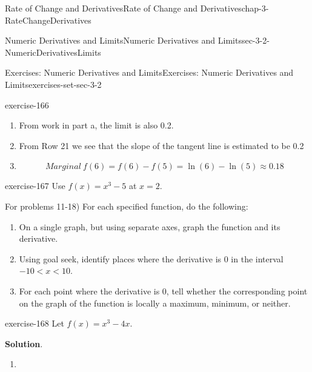 \documentclass[oneside,10pt,]{book}
\numberwithin{equation}{section}
\newcommand{\lt}{<}
\begin{document}
\begin{chapterptx}{Rate of Change and Derivatives}{}{Rate of Change and Derivatives}{}{}{chap-3-RateChangeDerivatives}
\begin{sectionptx}{Numeric Derivatives and Limits}{}{Numeric Derivatives and Limits}{}{}{sec-3-2-NumericDerivativesLimits}
\begin{exercises-subsection-numberless}{Exercises: Numeric Derivatives and Limits}{}{Exercises: Numeric Derivatives and Limits}{}{}{exercises-set-sec-3-2}
\begin{exercisegroup}
\begin{divisionexerciseeg}{9}{}{}{exercise-166}
\begin{enumerate}[label=(\alph*)]
\begin{sidebyside}{1}{0.05}{0.05}{0}
\end{sidebyside}%
\par
\hypertarget{p-1092}{}%
The slope of the secant line is 0.2.%
\item\hypertarget{li-338}{}\hypertarget{p-1093}{}%
From work in part a, the limit is also 0.2.%
\item\hypertarget{li-339}{}\hypertarget{p-1094}{}%
From Row 21 we see that the slope of the tangent line is estimated to be 0.2%
\item\hypertarget{li-340}{}\hypertarget{p-1095}{}%
%
\begin{equation*}
Marginal\ f(6)=f(6)-f(5)=\ln(6)-\ln(5)\approx 0.18
\end{equation*}
%
\end{enumerate}
\end{divisionexerciseeg}%
\begin{divisionexerciseeg}{10}{}{}{exercise-167}%
\hypertarget{p-1096}{}%
Use \(f(x)=x^3-5\) at \(x=2\).%
\end{divisionexerciseeg}%
\end{exercisegroup}
\par\medskip\noindent
\par\medskip\noindent%
\hypertarget{exercisegroup-16}{}%
\hypertarget{p-1097}{}%
For problems 11-18) For each specified function, do the following:%
\leavevmode%
\begin{enumerate}[label=(\alph*)]
\item\hypertarget{li-341}{}\hypertarget{p-1098}{}%
On a single graph, but using separate axes, graph the function and its derivative.%
\item\hypertarget{li-342}{}\hypertarget{p-1099}{}%
Using goal seek, identify places where the derivative is 0 in the interval \(-10 \lt x \lt 10\).%
\item\hypertarget{li-343}{}\hypertarget{p-1100}{}%
For each point where the derivative is 0, tell whether the corresponding point on the graph of the function is locally a maximum, minimum, or neither.%
\end{enumerate}
\begin{exercisegroup}
\begin{divisionexerciseeg}{11}{}{}{exercise-168}%
\hypertarget{p-1101}{}%
Let \(f(x)=x^3-4 x\).%
\par\smallskip%
\noindent\textbf{Solution}.\hypertarget{solution-83}{}\quad%
\leavevmode%
\begin{enumerate}[label=(\alph*)]
\item\hypertarget{li-344}{}\leavevmode%

\end{enumerate}
\end{divisionexerciseeg}
\end{exercisegroup}
\end{exercises-subsection-numberless}
\end{sectionptx}
\end{chapterptx}
\end{document}
